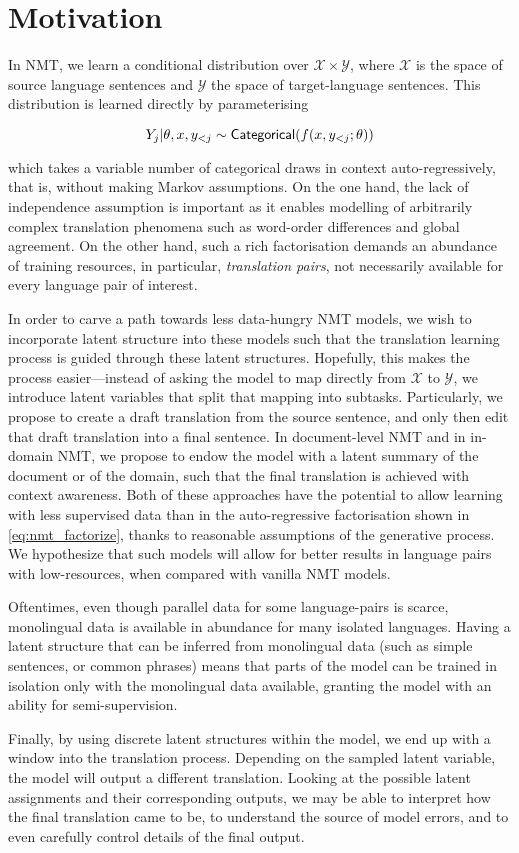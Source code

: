 \section{Motivation}
\label{sec:int_motivation}

In NMT, we learn a conditional distribution over $\mathcal X \times
\mathcal Y$, where $\mathcal X$ is the space of source language
sentences and $\mathcal{Y}$ the space of target-language sentences.
This distribution is learned directly by parameterising

\begin{equation}
    Y_j|\theta, x, y_{<j} \sim \operatorname{\mathsf{Categorical}}(f(x, y_{<j}; \theta))
    \label{eq:nmt_factorize}
\end{equation}

\noindent which takes a variable number of categorical draws in
context auto-regressively, that is, without making Markov
assumptions. On the one hand, the lack of independence assumption is
important as it enables modelling of arbitrarily complex translation
phenomena such as word-order differences and global agreement. On the
other hand, such a rich factorisation demands an abundance of
training resources, in particular, \emph{translation pairs}, not
necessarily available for every language pair of interest.

In order to carve a path towards less data-hungry NMT models, we wish
to incorporate latent structure into these models such that the
translation learning process is guided through these latent
structures. Hopefully, this makes the process easier---instead of
asking the model to map directly from $\mathcal{X}$ to $\mathcal{Y}$,
we introduce latent variables that split that mapping into subtasks.
Particularly, we propose to create a draft translation from the
source sentence, and only then edit that draft translation into a
final sentence. In document-level NMT and in in-domain NMT, we
propose to endow the model with a latent summary of the document or
of the domain, such that the final translation is achieved with
context awareness. Both of these approaches have the potential to
allow learning with less supervised data than in the auto-regressive
factorisation shown in \eqref{eq:nmt_factorize}, thanks to reasonable
assumptions of the generative process. We hypothesize that such models
will allow for better results in language pairs with low-resources,
when compared with vanilla NMT models.

Oftentimes, even though parallel data for some language-pairs is
scarce, monolingual data is available in abundance for many
isolated languages. Having a latent structure that can be inferred
from monolingual data (such as simple sentences, or common phrases)
means that parts of the model can be trained in isolation
only with the monolingual data available, granting the model
with an ability for semi-supervision.

Finally, by using discrete latent structures within the model, we end
up with a window into the translation process. Depending on the
sampled latent variable, the model will output a different
translation. Looking at the possible latent assignments and their
corresponding outputs, we may be able to interpret how the final
translation came to be, to understand the source of model errors,
and to even carefully control details of the final output.
